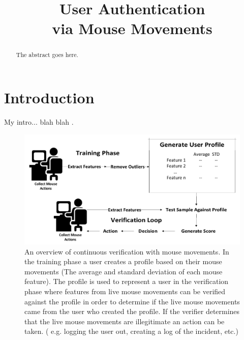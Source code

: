 \documentclass[conference]{IEEEtran}
\title{User Authentication\\via Mouse Movements}
\begin{document}
\maketitle


\begin{abstract}
The abstract goes here.
\end{abstract}
\IEEEpeerreviewmaketitle

\section{Introduction}
My intro... blah blah \cite{jj2}.

\begin{figure}[h!]
  \includegraphics[width=1\linewidth]{Overview.pdf}
\caption{An overview of continuous verification with mouse movements. In the training phase a user creates a profile based on their mouse movements (The average and standard deviation of each mouse feature). The profile is used to represent a user in the verification phase where features from live mouse movements can be verified against the profile in order to determine if the live mouse movements came from the user who created the profile. If the verifier determines that the live mouse movements are illegitimate an action can be taken. ( e.g. logging the user out, creating a log of the incident, etc.)}
\end{figure}
\end{document}
